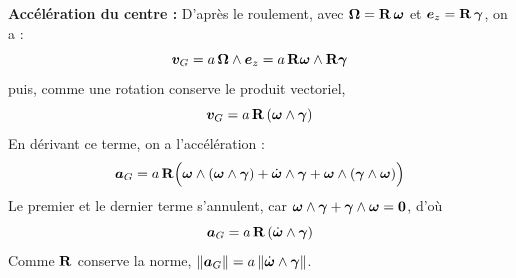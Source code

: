 \textbf{Accélération du centre : } D'après le roulement, avec
$\bm{\Omega} = \mathbf{R}\,\bm{\omega}$ et
$\bm{e}_z = \mathbf{R}\,\bm{\gamma}$, on a :
\[
    \bm{v}_G = a\,\bm{\Omega}\wedge\bm{e}_z
    = a\,\mathbf{R}\bm{\omega}\wedge\mathbf{R}\bm{\gamma}
\]
puis, comme une rotation conserve le produit vectoriel,
\[
    \bm{v}_G = a\,\mathbf{R}\,(\bm{\omega}\wedge\bm{\gamma})
\]
En dérivant ce terme, on a l'accélération :
\[
    \bm{a}_G = a\,\mathbf{R}\Bigl(
    \bm{\omega}\wedge(\bm{\omega}\wedge\bm{\gamma})
    + \dot{\bm{\omega}}\wedge\bm{\gamma}
    + \bm{\omega}\wedge(\bm{\gamma}\wedge\bm{\omega})\Bigr)
\]
Le premier et le dernier terme s'annulent, car
$\bm{\omega}\wedge\bm{\gamma} + \bm{\gamma}\wedge\bm{\omega}
= \bm{0}$, d'où
\[
    \bm{a}_G = a\,\mathbf{R}\,(\dot{\bm{\omega}}\wedge\bm{\gamma})
\]
Comme $\mathbf{R}$ conserve la norme,
$\|\bm{a}_G\| = a\,\|\dot{\bm{\omega}}\wedge\bm{\gamma}\|$.

